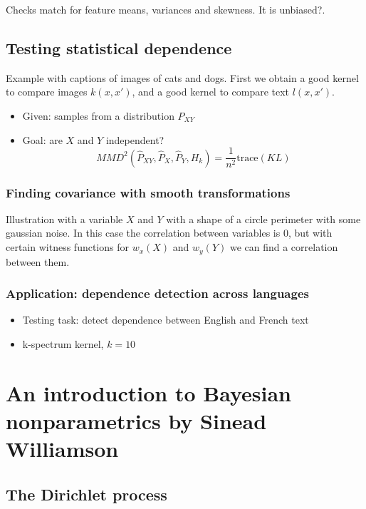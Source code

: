 \documentclass[b5paper]{report}
\begin{document}
Checks match for feature means, variances and skewness. It is unbiased?.

\section{Testing statistical dependence}

Example with captions of images of cats and dogs. First we obtain a good kernel
to compare images $k(x, x')$, and a good kernel to compare text $l(x, x')$.

\begin{itemize}
  \item Given: samples from a distribution $P_{XY}$
  \item Goal: are $X$ and $Y$ independent?
    \begin{equation}
      MMD^2(\hat{P}_{XY}, \hat{P}_X, \hat{P}_Y, H_k) =
      \frac{1}{n^2}\text{trace}(KL)
    \end{equation}
\end{itemize}

\subsection{Finding covariance with smooth transformations}

Illustration with a variable $X$ and $Y$ with a shape of a circle perimeter
with some gaussian noise. In this case the correlation between variables is 0,
but with certain witness functions for $w_x(X)$ and $w_y(Y)$ we can find a
correlation between them.

\subsection{Application: dependence detection across languages}

\begin{itemize}
  \item Testing task: detect dependence between English and French text
  \item k-spectrum kernel, $k=10$
\end{itemize}

\chapter{An introduction to Bayesian nonparametrics by Sinead Williamson}

\section{The Dirichlet process}
\end{document}
